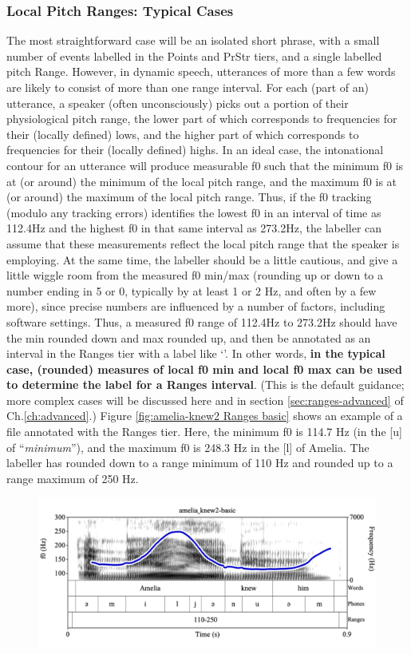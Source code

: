\documentclass[11pt, twoside]{memoir}
\def\textlabel#1{{\relsize{-.5}\fontspec[Mapping=tex-text]{Roboto Mono}{#1}}}
\def\langtext#1{\textit{#1}}
\begin{document}
{{\subsubsection{Local Pitch Ranges: Typical Cases}\label{sec:local-pitch-ranges-typical-cases}
The most straightforward case will be an isolated short phrase, with a small number of events labelled in the Points and PrStr tiers, and a single labelled pitch Range. However, in dynamic speech, utterances of more than a few words are likely to consist of more than one range interval.
For each (part of an) utterance, a speaker (often unconsciously) picks out a portion of their physiological pitch range, the lower part of which corresponds to frequencies for their (locally defined) lows, and the higher part of which corresponds to frequencies for their (locally defined) highs. In an ideal case, the intonational contour for an utterance will produce measurable f0 such that the minimum f0 is at (or around) the minimum of the local pitch range, and the maximum f0 is at (or around) the maximum of the local pitch range. Thus, if the f0 tracking (modulo any tracking errors) identifies the lowest f0 in an interval of time as 112.4Hz and the highest f0 in that same interval as 273.2Hz, the labeller can assume that these measurements reflect the local pitch range that the speaker is employing.
At the same time, the labeller should be a little cautious, and give a little wiggle room from the measured f0 min\slash max (rounding up or down to a number ending in 5 or 0, typically by at least 1 or 2 Hz, and often by a few more), since precise numbers are influenced by a number of factors, including software settings. Thus, a measured f0 range of 112.4Hz to 273.2Hz should have the min rounded down and max rounded up, and then be annotated as an interval in the Ranges tier with a label like ‘\textlabel{110-280}’. In other words, \textbf{in the typical case, (rounded) measures of local f0 min and local f0 max can be used to determine the label for a Ranges interval}. (This is the default guidance; more complex cases will be discussed here and in section \ref{sec:ranges-advanced} of Ch.\ref{ch:advanced}.)
Figure \ref{fig:amelia-knew2 Ranges basic} shows an example of a file annotated with the Ranges tier. Here, the minimum f0 is 114.7 Hz (in the [u] of “\langtext{minimum}”), and the maximum f0 is 248.3 Hz in the [l] of Amelia. The labeller has rounded down to a range minimum of 110 Hz and rounded up to a range maximum of 250 Hz.
\begin{figure}[H]
\centering
\includegraphics[width=.875\linewidth]{Ranges-amelia_knew2-basic.png}

\end{figure}}}
\end{document}
